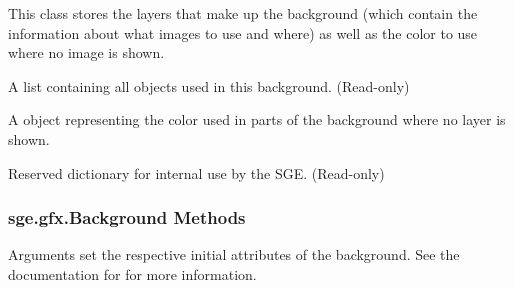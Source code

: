 \documentclass[letterpaper,10pt,english]{sphinxmanual}
\begin{document}
\begin{fulllineitems}
\label{gfx:sge.gfx.Background}
This class stores the layers that make up the background (which
contain the information about what images to use and where) as well
as the color to use where no image is shown.

\begin{fulllineitems}
\label{gfx:sge.gfx.Background.layers}
A list containing all {\hyperref[gfx:sge.gfx.BackgroundLayer]{\emph{}}} objects
used in this background.  (Read-only)

\end{fulllineitems}


\begin{fulllineitems}
\label{gfx:sge.gfx.Background.color}
A {\hyperref[gfx:sge.gfx.Color]{\emph{}}} object representing the color used in
parts of the background where no layer is shown.

\end{fulllineitems}


\begin{fulllineitems}
\label{gfx:sge.gfx.Background.rd}
Reserved dictionary for internal use by the SGE.  (Read-only)

\end{fulllineitems}


\end{fulllineitems}



\subsubsection{sge.gfx.Background Methods}
\label{gfx:sge-gfx-background-methods}

\begin{fulllineitems}
\label{gfx:sge.gfx.Background.__init__}
Arguments set the respective initial attributes of the
background.  See the documentation for
{\hyperref[gfx:sge.gfx.Background]{\emph{}}} for more information.

\end{fulllineitems}
\end{document}

